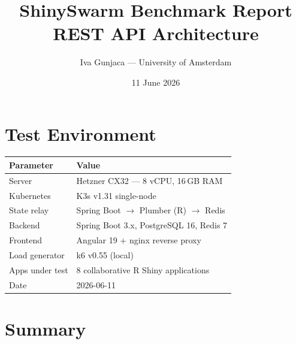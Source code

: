 \documentclass[11pt,a4paper]{article}
\title{ShinySwarm Benchmark Report\\[4pt]\large REST API Architecture}
\author{Iva Gunjaca — University of Amsterdam}
\date{11 June 2026}
\begin{document}
\maketitle

\section{Test Environment}

\begin{tabular}{@{}ll@{}}
\toprule
\textbf{Parameter}       & \textbf{Value} \\
\midrule
Server                    & Hetzner CX32 — 8 vCPU, 16\,GB RAM \\
Kubernetes                & K3s v1.31 single-node \\
State relay               & Spring Boot $\to$ Plumber (R) $\to$ Redis \\
Backend                   & Spring Boot 3.x, PostgreSQL 16, Redis 7 \\
Frontend                  & Angular 19 + nginx reverse proxy \\
Load generator            & k6 v0.55 (local) \\
Apps under test           & 8 collaborative R Shiny applications \\
Date                      & 2026-06-11 \\
\bottomrule
\end{tabular}

\section{Summary}
\end{document}
